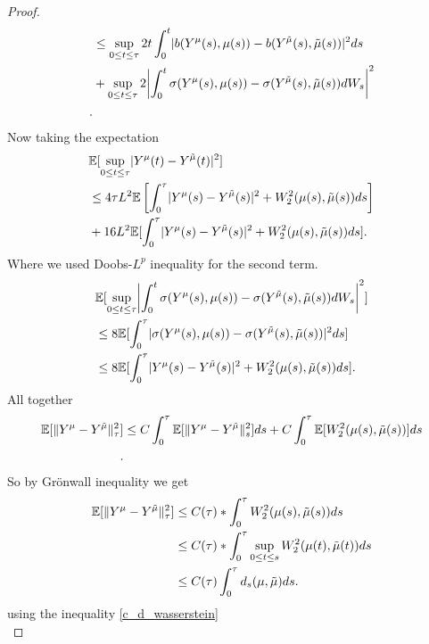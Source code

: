 \begin{proof}
\begin{align*}
   &\le \sup_{0\le t \le \tau } 2t \int_0^{t} \abs{b(Y^{\mu }(s),\mu(s) )- b(Y^{\tilde{\mu}}(s),\tilde{\mu}(s) )}^2 ds \\
   &+ \sup_{0\le t \le \tau }2 \abs*{\int_0^{t} \sigma(Y^{\mu }(s),\mu(s) ) - \sigma (Y^{\tilde{\mu}}(s),\tilde{\mu}(s) ) dW_s}^2 \\
 .\end{align*}
 Now taking the expectation 
 \begin{align*}
   &\mathbb{E}[\sup_{0\le t \le \tau }\lvert Y^{\mu }(t) - Y^{\tilde{\mu } }(t)\rvert^2] \\
   &\le 4\tau  L^2 \mathbb{E}\left[\int_0^{\tau } \lvert Y^{\mu }(s) - Y^{\tilde{\mu } }(s)  \rvert^2 + W_2^2(\mu(s) ,\tilde{\mu}(s) ) ds \right]\\
   &+ 16 L^2 \mathbb{E}[\int_0^{\tau } \lvert Y^{\mu}(s) - Y^{\tilde{\mu } }(s)  \rvert^2 + W_2^2(\mu(s),\tilde{\mu }(s) )  ds]
 .\end{align*}
 Where we used Doobs-$L^{p} $ inequality for the second term.
 \begin{align*}
   &\E[\sup_{0\le t\le \tau }\abs*{\int_0^{t} \sigma(Y^{\mu }(s),\mu(s) ) - \sigma (Y^{\tilde{\mu}}(s),\tilde{\mu}(s) ) dW_s}^2] \\
   &\le 8 \E[\int_0^{\tau } \abs{\sigma(Y^{\mu }(s),\mu(s) ) - \sigma (Y^{\tilde{\mu}}(s),\tilde{\mu}(s) )}^2 ds]\\
   &\le 8 \E[\int_0^{\tau } \abs{Y^{\mu}(s) - Y^{\tilde{\mu } }(s)  }^2 + W_2^2(\mu(s),\tilde{\mu }(s) )  ds]
 .\end{align*}
 All together 
 \begin{align*}
   \mathbb{E}[\|Y^{\mu } - Y^{\tilde{\mu } }\|_{\tau}^2] &\le C \int_0^{\tau } \mathbb{E}[\|Y^{\mu } - Y^{\tilde{\mu } }\|_s^2] ds + C \int_0^{\tau } \mathbb{E}[W_2^2(\mu(s),\tilde{\mu }(s) )]  ds  \\
 .\end{align*}
 So by Grönwall inequality we get 
 \begin{align*}
   \mathbb{E}[\|Y^{\mu } - Y^{\tilde{\mu } }\|_{\tau}^2] &\le C(\tau )* \int_0^{\tau }  W_2^2(\mu(s) ,\tilde{\mu }(s) ) ds \\                                               
                                                 &\le C(\tau )* \int_0^{\tau }  \sup_{0\le t \le s} W_2^2(\mu(t) ,\tilde{\mu }(t) ) ds \\                                              
                                                 &\le C(\tau ) \int_0^{\tau } d_s(\mu ,\tilde{\mu } )ds
 .\end{align*}
 using  the inequality \autoref{c_d_wasserstein}\\[1ex]

\end{proof}
